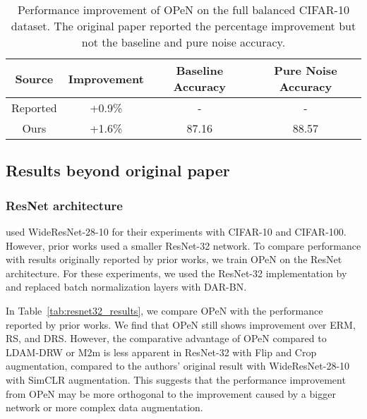 \begin{table}[!ht]
    \centering
    \begin{tabular}{c|c|c|c}
        Source & Improvement & Baseline Accuracy & Pure Noise Accuracy \\ \hline
        Reported & +0.9\% & - & - \\ 
        Ours & +1.6\% & 87.16 & 88.57 \\
    \end{tabular}
    \caption{Performance improvement of OPeN on the full balanced CIFAR-10 dataset. The original paper reported the percentage improvement but not the baseline and pure noise accuracy.}
    \label{tab:balanced_results}
\end{table}


\subsection{Results beyond original paper}

\subsubsection{ResNet architecture}

\citet{PureNoise} used WideResNet-28-10 for their experiments with CIFAR-10 and CIFAR-100. However, prior works \citep{LDAM-DRW, M2m, MiSLAS} used a smaller ResNet-32 network. To compare performance with results originally reported by prior works, we train OPeN on the ResNet architecture. For these experiments, we used the ResNet-32 implementation by \citet{ResNet_akamaster} and replaced batch normalization layers with DAR-BN.

In Table~\ref{tab:resnet32_results}, we compare OPeN with the performance reported by prior works. We find that OPeN still shows improvement over ERM, RS, and DRS. However, the comparative advantage of OPeN compared to LDAM-DRW or M2m is less apparent in ResNet-32 with Flip and Crop augmentation, compared to the authors' original result with WideResNet-28-10 with SimCLR augmentation. This suggests that the performance improvement from OPeN may be more orthogonal to the improvement caused by a bigger network or more complex data augmentation.

